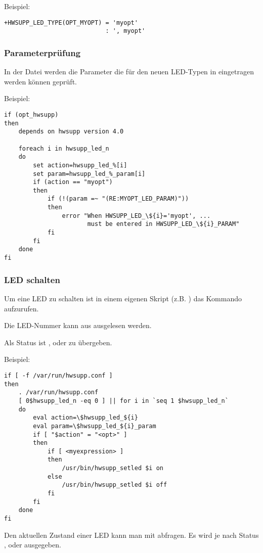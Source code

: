 Beispiel:
\begin{verbatim}
+HWSUPP_LED_TYPE(OPT_MYOPT) = 'myopt' 
                            : ', myopt'
\end{verbatim}

\subsubsection{Parameterprüfung}
  In der Datei  werden die Parameter die für den neuen
  LED-Typen in  eingetragen werden können geprüft.

Beispiel:
\begin{verbatim}
if (opt_hwsupp)
then
    depends on hwsupp version 4.0

    foreach i in hwsupp_led_n
    do
        set action=hwsupp_led_%[i]
        set param=hwsupp_led_%_param[i]
        if (action == "myopt")
        then
            if (!(param =~ "(RE:MYOPT_LED_PARAM)"))
            then
                error "When HWSUPP_LED_\${i}='myopt', ...
                       must be entered in HWSUPP_LED_\${i}_PARAM" 
            fi
        fi
    done
fi
\end{verbatim}

\subsubsection {LED schalten}
  Um eine LED zu schalten ist in einem eigenen Skript 
  (z.B. ) das Kommando 
   aufzurufen.
  
  Die LED-Nummer kann aus  ausgelesen werden.
  
  Als Status ist ,  oder  zu übergeben.
  
 

Beispiel:
\begin{verbatim}
if [ -f /var/run/hwsupp.conf ]
then
    . /var/run/hwsupp.conf
    [ 0$hwsupp_led_n -eq 0 ] || for i in `seq 1 $hwsupp_led_n`
    do
        eval action=\$hwsupp_led_${i}
        eval param=\$hwsupp_led_${i}_param
        if [ "$action" = "<opt>" ]
        then
            if [ <myexpression> ]
            then
                /usr/bin/hwsupp_setled $i on
            else
                /usr/bin/hwsupp_setled $i off
            fi
        fi
    done
fi
\end{verbatim}

  Den aktuellen Zustand einer LED kann man mit 
   abfragen.
  Es wird je nach Status ,  oder  ausgegeben.
  
